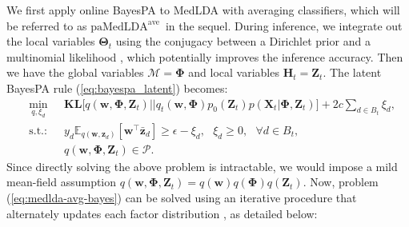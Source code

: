 \documentclass[twoside,11pt]{article}
\newcommand{\Xv}{\bm{X}}
\newcommand{\zv}{\bm{z}}
\newcommand{\Zv}{\bm{Z}}
\newcommand{\Hv}{\bm{H}}
\newcommand{\wv}{\bm{w}}
\newcommand{\Thetav}{\bm{\Theta}}
\newcommand{\Phiv}{\bm{\Phi}}
\newcommand{\Mv}{\bm{\mathcal{M}}}
\newcommand{\ep}{\mathbb{E}}
\newcommand{\KL}{\textbf{KL}}
\newcommand{\barzv}{\bm{\bar{z}}}
\newcommand{\subto}{\text{s.t.:}}
\newcommand\paMedLDAave{$\text{paMedLDA}^{\text{ave}}$~}
\begin{document}
We first apply online BayesPA to MedLDA with averaging classifiers, which will be referred to as \paMedLDAave in the sequel. During inference, we integrate out the local variables $\Thetav_t$ using the conjugacy between a Dirichlet prior and a multinomial likelihood \citep{griffiths2004finding,teh2006collapsed}, which potentially improves the inference accuracy. Then we have the global variables $\Mv = \Phiv$ and local variables $\Hv_t = \Zv_t$. The latent BayesPA rule (\ref{eq:bayespa_latent}) becomes:
\begin{eqnarray}\label{eq:medlda-avg-bayes}
 &  \underset{q, \xi_d}{\operatorname{min}}~~~ & \KL\Big[q(\wv, \Phiv, \Zv_t) || q_t(\wv, \Phiv) p_0(\Zv_t) p(\Xv_t | \Phiv, \Zv_t) \Big] + 2c \sum\limits_{d \in B_t}{\xi_d}, \\
 & \subto &  y_d \ep_{q(\wv, \zv_d)}[\wv^\top \barzv_d] \geq \epsilon-\xi_d, ~~~ \xi_d \geq 0, ~~~  \forall d \in B_t,  \nonumber \\
 &            & q(\wv, \Phiv, \Zv_t) \in \mathcal{P}. \nonumber
\end{eqnarray}
%
Since directly solving the above problem is intractable, we would impose a mild mean-field assumption $q(\wv, \Phiv, \Zv_t) = q(\wv) q(\Phiv) q(\Zv_t)$. Now, problem (\ref{eq:medlda-avg-bayes}) can be solved using an iterative procedure that alternately updates each factor distribution \citep{jordan1998introduction}, as detailed below:
%
\end{document}

